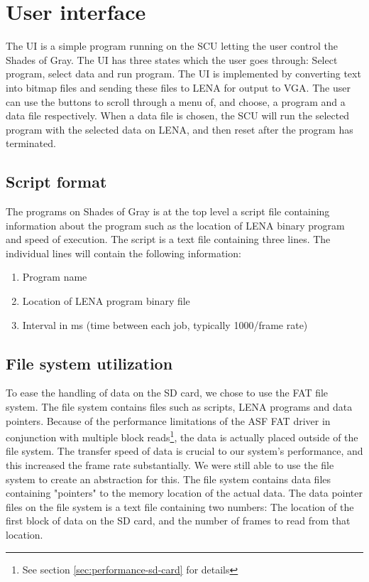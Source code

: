 \section{User interface}
The \ac{UI} is a simple program running on the \ac{SCU} letting the user control the { Shades of Gray}. The \ac{UI} has three states which the user goes through: Select program, select data and run program. The \ac{UI} is implemented by converting text into bitmap files and sending these files to \ac{LENA} for output to VGA. The user can use the buttons to scroll through a menu of, and choose, a program and a data file respectively. When a data file is chosen, the \ac{SCU} will run the selected program with the selected data on \ac{LENA}, and then reset after the program has terminated.


\subsection{Script format}
The programs on { Shades of Gray} is at the top level a script file
containing information about the program such as the location of \ac{LENA} binary program and speed of execution. The script is a text file containing three lines. The individual lines will
contain the following information:

\begin{enumerate}
\item Program name
\item Location of \ac{LENA} program binary file
\item Interval in ms (time between each job, typically 1000/frame rate)
\end{enumerate}

\subsection{File system utilization}
To ease the handling of data on the SD card, we chose to use the FAT
file system. The file system contains files such as scripts, \ac{LENA}
programs and data pointers. Because of the performance limitations of
the \ac{ASF} FAT driver in conjunction with multiple block
reads\footnote{See section \ref{sec:performance-sd-card} for details}, the
data is actually placed outside of the file system. The transfer speed
of data is crucial to our system's performance, and this increased the
frame rate substantially. We were still able to use the file system to
create an abstraction for this. The file system contains data files
containing "pointers" to the memory location of the actual data. The
data pointer files on the file system is a text file containing two
numbers: The location of the first block of data on the SD card, and the
number of frames to read from that location.


